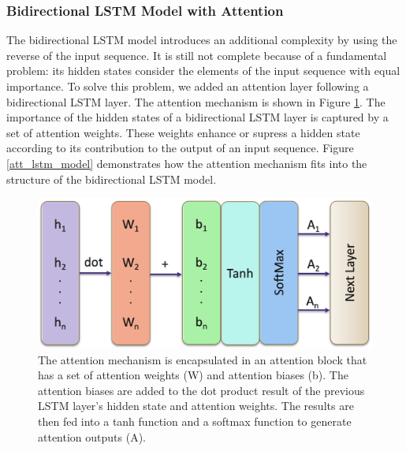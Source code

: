 \documentclass[sigconf,authorversion]{acmart}
\begin{document}
\subsubsection{Bidirectional LSTM Model with Attention}

The bidirectional LSTM model introduces an additional complexity by using the 
reverse of the input sequence. It is still not complete because of a fundamental
problem: its hidden states consider the elements of the input sequence with 
equal importance. To solve this problem, we added an attention layer following 
a bidirectional LSTM layer. The attention mechanism is shown in Figure 
\ref{attention_mechanism}. The importance of the hidden states of a bidirectional 
LSTM layer is captured by a set of attention weights. These weights enhance or 
supress a hidden state according to its contribution to the output of an input
sequence. Figure \ref{att_lstm_model} demonstrates how the attention mechanism
fits into the structure of the bidirectional LSTM model.

\begin{figure}[h]
  \centering
  \includegraphics[width=\linewidth]{attention_mec.png}
  \caption{The attention mechanism is encapsulated in an attention block that has
  a set of attention weights (W) and attention biases (b). The attention biases are
  added to the dot product result of the previous LSTM layer's hidden state and 
  attention weights. The results are then fed into a tanh function and a softmax
  function to generate attention outputs (A).}
  \label{attention_mechanism}
\end{figure}
\end{document}
